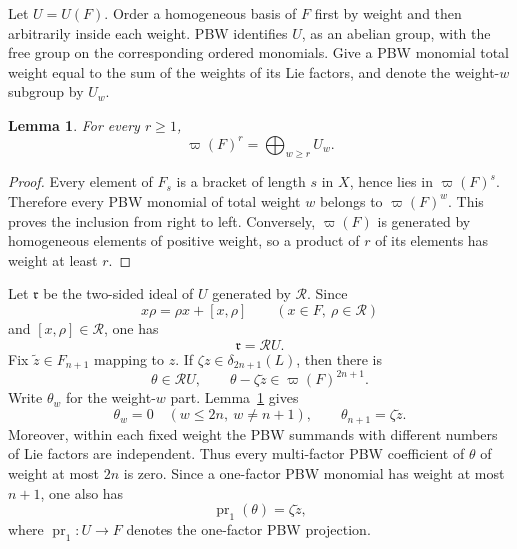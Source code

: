 \documentclass[11pt]{amsart}
\newtheorem{lemma}[theorem]{Lemma}
\theoremstyle{remark}
\newcommand{\aug}{\varpi}
\newcommand{\Rel}{\mathcal R}
\newcommand{\pr}{\operatorname{pr}}
\begin{document}
Let $U=U(F)$.  Order a homogeneous basis of $F$ first by weight and
then arbitrarily inside each weight.  PBW identifies $U$, as an
abelian group, with the free group on the corresponding ordered
monomials.  Give a PBW monomial total weight equal to the sum of the
weights of its Lie factors, and denote the weight-$w$ subgroup by
$U_w$.

\begin{lemma}\label{lem:augmentation-weight}
For every $r\geq1$,
\[
                         \aug(F)^r=\bigoplus_{w\geq r}U_w.
\]
\end{lemma}

\begin{proof}
Every element of $F_s$ is a bracket of length $s$ in $X$, hence lies
in $\aug(F)^s$.  Therefore every PBW monomial of total weight $w$
belongs to $\aug(F)^w$.  This proves the inclusion from right to left.
Conversely, $\aug(F)$ is generated by homogeneous elements of positive
weight, so a product of $r$ of its elements has weight at least $r$.
\end{proof}

Let $\mathfrak r$ be the two-sided ideal of $U$ generated by $\Rel$.
Since
\[
 x\rho=\rho x+[x,\rho]
 \qquad(x\in F,\ \rho\in\Rel)
\]
and $[x,\rho]\in\Rel$, one has
\begin{equation}\label{eq:left-ideal}
                         \mathfrak r=\Rel U.
\end{equation}
Fix $\widetilde z\in F_{n+1}$ mapping to $z$.  If
$\zeta z\in\delta_{2n+1}(L)$, then there is
\begin{equation}\label{eq:witness}
 \theta\in\Rel U,
 \qquad
 \theta-\zeta\widetilde z\in\aug(F)^{2n+1}.
\end{equation}
Write $\theta_w$ for the weight-$w$ part.
Lemma~\ref{lem:augmentation-weight} gives
\begin{equation}\label{eq:governing}
 \theta_w=0\quad(w\leq2n,\ w\ne n+1),
 \qquad
 \theta_{n+1}=\zeta\widetilde z.
\end{equation}
Moreover, within each fixed weight the PBW summands with different
numbers of Lie factors are independent.  Thus every multi-factor
PBW coefficient of $\theta$ of weight at most $2n$ is zero.
Since a one-factor PBW monomial has weight at most $n+1$, one also has
\begin{equation}\label{eq:primitive-witness}
                         \pr_1(\theta)=\zeta\widetilde z,
\end{equation}
where $\pr_1:U\to F$ denotes the one-factor PBW projection.
\end{document}
